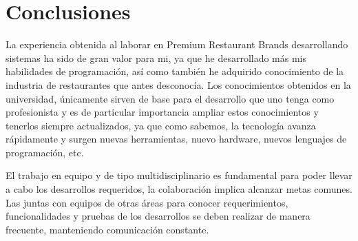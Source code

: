 
\chapter{Conclusiones}
\label{chap:conclusiones}

La experiencia obtenida al laborar en Premium Restaurant Brands desarrollando sistemas ha sido de gran valor para mi, ya que he desarrollado más mis habilidades de programación, así como también he adquirido conocimiento de la industria de restaurantes que antes desconocía. Los conocimientos obtenidos en la universidad, únicamente sirven de base para el desarrollo que uno tenga como profesionista y es de particular importancia ampliar estos conocimientos y tenerlos siempre actualizados, ya que como sabemos, la tecnología avanza rápidamente y surgen nuevas herramientas, nuevo hardware, nuevos lenguajes de programación, etc.

El trabajo en equipo y de tipo multidisciplinario es fundamental para poder llevar a cabo los desarrollos requeridos, la colaboración implica alcanzar metas comunes. Las juntas con equipos de otras áreas para conocer requerimientos, funcionalidades y pruebas de los desarrollos se deben realizar de manera frecuente, manteniendo comunicación constante.



